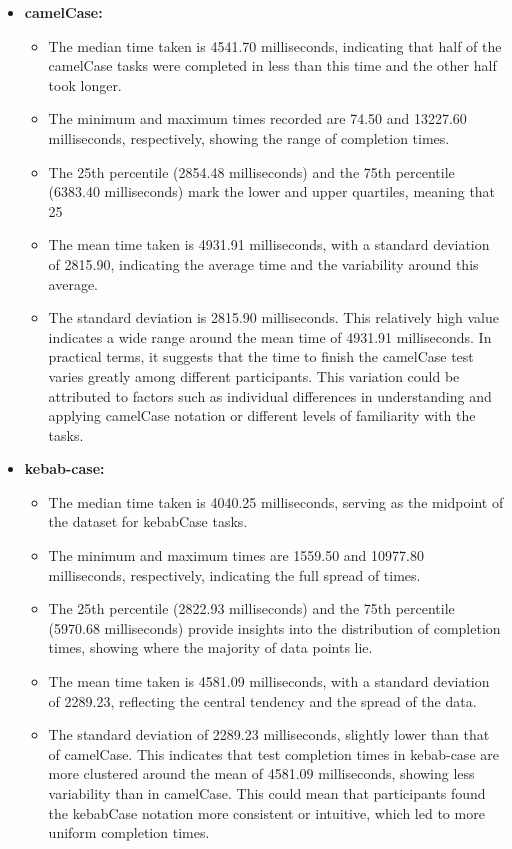 \documentclass{article}
\begin{document}
\begin{itemize}
\item \textbf{camelCase:}
\begin{itemize}
\item The median time taken is 4541.70 milliseconds, indicating that half of the camelCase tasks were completed in less than this time and the other half took longer.
\item The minimum and maximum times recorded are 74.50 and 13227.60 milliseconds, respectively, showing the range of completion times.
\item The 25th percentile (2854.48 milliseconds) and the 75th percentile (6383.40 milliseconds) mark the lower and upper quartiles, meaning that 25%
\item The mean time taken is 4931.91 milliseconds, with a standard deviation of 2815.90, indicating the average time and the variability around this average.
\item The standard deviation is 2815.90 milliseconds. This relatively high value indicates a wide range around the mean time of 4931.91 milliseconds. In practical terms, it suggests that the time to finish the camelCase test varies greatly among different participants. This variation could be attributed to factors such as individual differences in understanding and applying camelCase notation or different levels of familiarity with the tasks.

\end{itemize}
\item \textbf{kebab-case:}
\begin{itemize}
\item The median time taken is 4040.25 milliseconds, serving as the midpoint of the dataset for kebabCase tasks.
\item The minimum and maximum times are 1559.50 and 10977.80 milliseconds, respectively, indicating the full spread of times.
\item The 25th percentile (2822.93 milliseconds) and the 75th percentile (5970.68 milliseconds) provide insights into the distribution of completion times, showing where the majority of data points lie.
\item The mean time taken is 4581.09 milliseconds, with a standard deviation of 2289.23, reflecting the central tendency and the spread of the data.
\item The standard deviation of 2289.23 milliseconds, slightly lower than that of camelCase. This indicates that test completion times in kebab-case are more clustered around the mean of 4581.09 milliseconds, showing less variability than in camelCase. This could mean that participants found the kebabCase notation more consistent or intuitive, which led to more uniform completion times.

\end{itemize}
\end{itemize}
\end{document}
